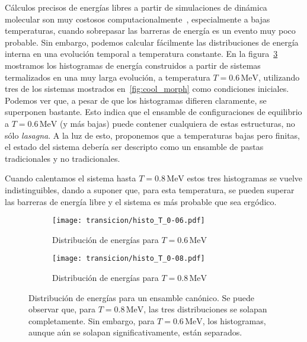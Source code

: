 Cálculos precisos de energías libres a partir de simulaciones de dinámica molecular son muy costosos computacionalmente~\cite[pp. 167-200]{frenkel_understanding_2001}, especialmente a bajas temperaturas, cuando sobrepasar las barreras de energía es un evento muy poco probable.
Sin embargo, podemos calcular fácilmente las distribuciones de energía interna en una evolución temporal a temperatura constante.
En la figura~\ref{fig:histo} mostramos los histogramas de energía construidos a partir de sistemas termalizados en una muy larga evolución, a temperatura $T=0.6\,\text{MeV}$, utilizando tres de los sistemas mostrados en~\ref{fig:cool_morph} como condiciones iniciales.
Podemos ver que, a pesar de que los histogramas difieren claramente, se superponen bastante.
Esto indica que el ensamble de configuraciones de equilibrio a $T=0.6\,\text{MeV}$ (y más bajas) puede contener cualquiera de estas estructuras, no sólo \emph{lasagna}.
A la luz de esto, proponemos que a temperaturas bajas pero finitas, el estado del sistema debería ser descripto como un ensamble de pastas tradicionales y no tradicionales.

Cuando calentamos el sistema hasta $T=0.8\,\text{MeV}$ estos tres histogramas se vuelve indistinguibles, dando a suponer que, para esta temperatura, se pueden superar las barreras de energía libre y el sistema es más probable que sea ergódico.

\begin{figure}[floatfix]%
  \centering
  \begin{subfigure}[h!]{0.45\columnwidth}
    \texttt{[image: transicion/histo\_T\_0-06.pdf]}
    \caption{Distribución de energías para $T=0.6\,\text{MeV}$}
\label{subfig:histo_T_0-06}
  \end{subfigure}
  \begin{subfigure}[h!]{0.45\columnwidth}
    \texttt{[image: transicion/histo\_T\_0-08.pdf]}
    \caption{Distribución de energías para $T=0.8\,\text{MeV}$}
\label{subfig:histo_T_0-08}
  \end{subfigure}
  \caption{Distribución de energías para un ensamble canónico.
    Se puede observar que, para $T=0.8\,\text{MeV}$, las tres distribuciones se solapan completamente.
    Sin embargo, para $T=0.6\,\text{MeV}$, los histogramas, aunque aún se solapan significativamente, están separados.}
\label{fig:histo}
\end{figure}

